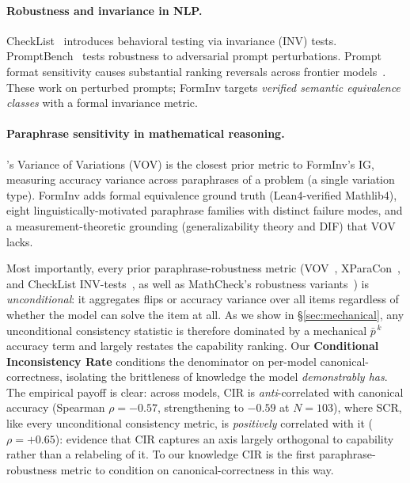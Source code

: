 \documentclass{article}
\begin{document}
\paragraph{Robustness and invariance in NLP.}
CheckList~\citep{ribeiro2020checklist} introduces behavioral testing via invariance (INV) tests.
PromptBench~\citep{zhu2024promptbench} tests robustness to adversarial prompt perturbations.
Prompt format sensitivity causes substantial ranking reversals across frontier models~\citep{sclar2023formatspread,romanou2026brittlebench}.
These work on perturbed prompts; FormInv targets \emph{verified semantic equivalence classes} with a formal invariance metric.

\paragraph{Paraphrase sensitivity in mathematical reasoning.}
\citet{zhou2024surface}'s Variance of Variations (VOV) is the closest prior metric to FormInv's IG, measuring accuracy variance across paraphrases of a problem (a single variation type). FormInv adds formal equivalence ground truth (Lean4-verified Mathlib4), eight linguistically-motivated paraphrase families with distinct failure modes, and a measurement-theoretic grounding (generalizability theory and DIF) that VOV lacks.

Most importantly, every prior paraphrase-robustness metric (VOV~\citep{zhou2024surface}, XParaCon~\citep{choi2025roparq}, and CheckList INV-tests~\citep{ribeiro2020checklist}, as well as MathCheck's robustness variants~\citep{zhou2024mathcheck}) is \emph{unconditional}: it aggregates flips or accuracy variance over all items regardless of whether the model can solve the item at all. As we show in \S\ref{sec:mechanical}, any unconditional consistency statistic is therefore dominated by a mechanical $\bar p^{\,k}$ accuracy term and largely restates the capability ranking. Our \textbf{Conditional Inconsistency Rate} conditions the denominator on per-model canonical-correctness, isolating the brittleness of knowledge the model \emph{demonstrably has}. The empirical payoff is clear: across models, CIR is \emph{anti}-correlated with canonical accuracy (Spearman $\rho=-0.57$, strengthening to $-0.59$ at $N=103$), where SCR, like every unconditional consistency metric, is \emph{positively} correlated with it ($\rho=+0.65$): evidence that CIR captures an axis largely orthogonal to capability rather than a relabeling of it. To our knowledge CIR is the first paraphrase-robustness metric to condition on canonical-correctness in this way.
\end{document}

